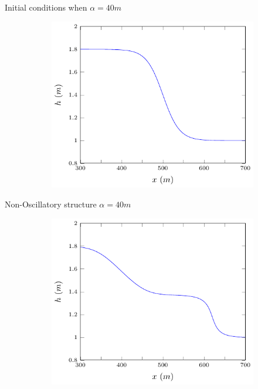 \documentclass[pdf]{beamer}
\begin{document}
\begin{frame}{Initial conditions when $\alpha = 40m$}
	\begin{figure}
		\centering
		\begin{subfigure}{0.75\textwidth}
			\includegraphics[width=\textwidth]{../Pics/init/DBs1/1-figure0.pdf}
		\end{subfigure}%
	\end{figure}
\end{frame}

\begin{frame}{Non-Oscillatory structure  $\alpha = 40m$}
	\begin{figure}
		\centering
		\begin{subfigure}{0.75\textwidth}
			\includegraphics[width=\textwidth]{../Pics/DBstruct/1.pdf}
		\end{subfigure}%
	\end{figure}
\end{frame}
\end{document}
